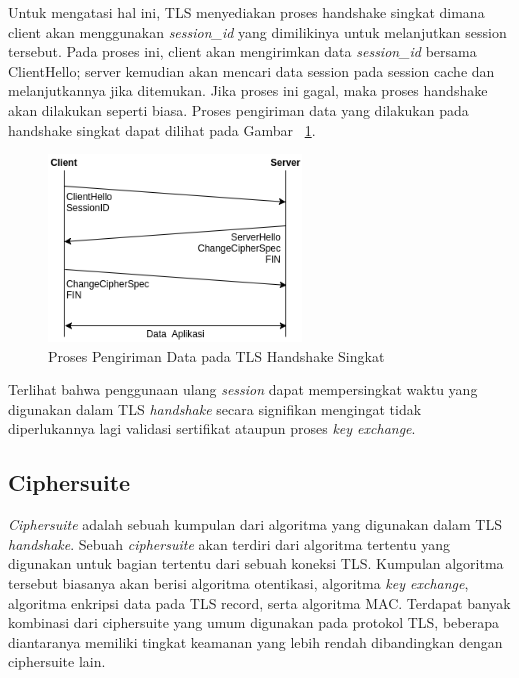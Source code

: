 Untuk mengatasi hal ini, TLS menyediakan proses handshake singkat dimana client akan menggunakan \textit{session\_id} yang dimilikinya untuk melanjutkan session tersebut. Pada proses ini, client akan mengirimkan data \textit{session\_id} bersama ClientHello; server kemudian akan mencari data session pada session cache dan melanjutkannya jika ditemukan. Jika proses ini gagal, maka proses handshake akan dilakukan seperti biasa. Proses pengiriman data yang dilakukan pada handshake singkat dapat dilihat pada Gambar ~\ref{fig:tls-fast-handshake}.

\begin{figure}[h]
  \centering
  \includegraphics[width=0.6\textwidth]{resources/ch-2/fast-handshake.png}
  \caption{Proses Pengiriman Data pada TLS Handshake Singkat \protect\citep{rfc5246}}
  \label{fig:tls-fast-handshake}
\end{figure}

Terlihat bahwa penggunaan ulang \textit{session} dapat mempersingkat waktu yang digunakan dalam TLS \textit{handshake} secara signifikan mengingat tidak diperlukannya lagi validasi sertifikat ataupun proses \textit{key exchange}.

\subsection{Ciphersuite}
\textit{Ciphersuite} adalah sebuah kumpulan dari algoritma yang digunakan dalam TLS \textit{handshake}. Sebuah \textit{ciphersuite} akan terdiri dari algoritma tertentu yang digunakan untuk bagian tertentu dari sebuah koneksi TLS. Kumpulan algoritma tersebut biasanya akan berisi algoritma otentikasi, algoritma \textit{key exchange}, algoritma enkripsi data pada TLS record, serta algoritma MAC. Terdapat banyak kombinasi dari ciphersuite yang umum digunakan pada protokol TLS, beberapa diantaranya memiliki tingkat keamanan yang lebih rendah dibandingkan dengan ciphersuite lain.

